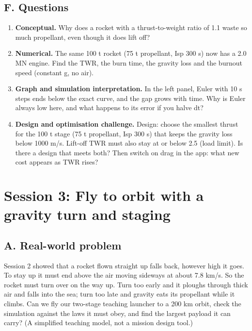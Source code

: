 \documentclass[11pt,a4paper]{article}
\begin{document}
\subsection*{F. Questions}
\begin{enumerate}[nosep]
\item \textbf{Conceptual.} Why does a rocket with a thrust-to-weight ratio of 1.1 waste so much propellant, even though it does lift off?
\item \textbf{Numerical.} The same 100 t rocket (75 t propellant, Isp 300 s) now has a 2.0 MN engine. Find the TWR, the burn time, the gravity loss and the burnout speed (constant g, no air).
\item \textbf{Graph and simulation interpretation.} In the left panel, Euler with 10 s steps ends below the exact curve, and the gap grows with time. Why is Euler always low here, and what happens to its error if you halve dt?
\item \textbf{Design and optimisation challenge.} Design: choose the smallest thrust for the 100 t stage (75 t propellant, Isp 300 s) that keeps the gravity loss below 1000 m/s. Lift-off TWR must also stay at or below 2.5 (load limit). Is there a design that meets both? Then switch on drag in the app: what new cost appears as TWR rises?
\end{enumerate}

\section{Session 3: Fly to orbit with a gravity turn and staging}

\subsection*{A. Real-world problem}
Session 2 showed that a rocket flown straight up falls back, however high it goes. To stay up it must end above the air moving sideways at about 7.8 km/s. So the rocket must turn over on the way up. Turn too early and it ploughs through thick air and falls into the sea; turn too late and gravity eats its propellant while it climbs. Can we fly our two-stage teaching launcher to a 200 km orbit, check the simulation against the laws it must obey, and find the largest payload it can carry? (A simplified teaching model, not a mission design tool.)
\end{document}
